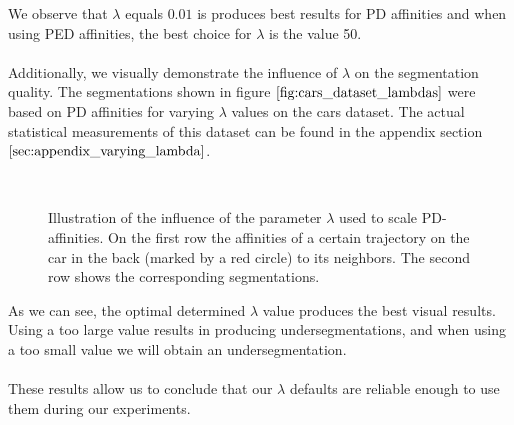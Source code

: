 We observe that $\lambda$ equals $0.01$ is produces best results for PD affinities and when using PED affinities, the best choice for $\lambda$ is the value 50. \\ \\
Additionally, we visually demonstrate the influence of $\lambda$ on the segmentation quality. The segmentations shown in figure $\ref{fig:cars_dataset_lambdas}$ were based on PD affinities for varying $\lambda$ values on the cars dataset. The actual statistical measurements of this dataset can be found in the appendix section $\ref{sec:appendix_varying_lambda}$.
\begin{figure}[H]
\begin{center}
~
\end{center}
\caption[Influence varying $\lambda$]{Illustration of the influence of the parameter $\lambda$ used to scale PD-affinities. On the first row the affinities of a certain trajectory on the car in the back (marked by a red circle) to its neighbors. The second row shows the corresponding segmentations.}
\label{fig:cars_dataset_lambdas}
\end{figure}
As we can see, the optimal determined $\lambda$ value produces the best visual results. Using a too large value results in producing undersegmentations, and when using a too small value we will obtain an undersegmentation. \\ \\
These results allow us to conclude that our $\lambda$ defaults are reliable enough to use them during our experiments.


